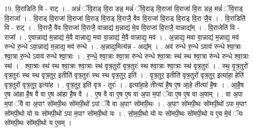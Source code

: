 \documentclass[17pt]{extarticle}
\begin{document}
19. वि॒राडिति॑ वि - राट् । . अन्नं॑ ॅवि॒राड् वि॒रा डन्न॒ मन्नं॑ ॅवि॒राड् वि॒राजा॑ वि॒राजा॑ वि॒रा डन्न॒ मन्नं॑ ॅवि॒राड् वि॒राजा᳚ । . वि॒राड् वि॒राजा॑ वि॒राजा॑ वि॒राड् वि॒राड् वि॒राजै॒ वैव वि॒राजा॑ वि॒राड् वि॒राड् वि॒रा जै॒व । . वि॒राडिति॑ वि - राट् । . वि॒राजै॒ वैव वि॒राजा॑ वि॒राजै॒ वान्नाद्य॑ म॒न्नाद्य॑ मे॒व वि॒राजा॑ वि॒राजै॒ वान्नाद्य᳚म् । . वि॒राजेति॑ वि - राजा᳚ । . ए॒वान्नाद्य॑ म॒न्नाद्य॑ मे॒वै वान्नाद्य॒ मवा वा॒न्नाद्य॑ मे॒वै वान्नाद्य॒ मव॑ । . अ॒न्नाद्य॒ मवा वा॒न्नाद्य॑ म॒न्नाद्य॒ मव॑ रुन्धे रु॒न्धे ऽवा॒न्नाद्य॑ म॒न्नाद्य॒ मव॑ रुन्धे । . अ॒न्नाद्य॒मित्य॑न्न - अद्य᳚म् । . अव॑ रुन्धे रु॒न्धे ऽवाव॑ रुन्धे श्वा॒त्राः श्वा॒त्रा रु॒न्धे ऽवाव॑ रुन्धे श्वा॒त्राः । . रु॒न्धे॒ श्वा॒त्राः श्वा॒त्रा रु॑न्धे रुन्धे श्वा॒त्राः स्थ॑ स्थ श्वा॒त्रा रु॑न्धे रुन्धे श्वा॒त्राः स्थ॑ । . श्वा॒त्राः स्थ॑ स्थ श्वा॒त्राः श्वा॒त्राः स्थ॑ वृत्र॒तुरो॑ वृत्र॒तुरः॑ स्थ श्वा॒त्राः श्वा॒त्राः स्थ॑ वृत्र॒तुरः॑ । . स्थ॒ वृ॒त्र॒तुरो॑ वृत्र॒तुरः॑ स्थ स्थ वृत्र॒तुर॒ इतीति॑ वृत्र॒तुरः॑ स्थ स्थ वृत्र॒तुर॒ इति॑ । . वृ॒त्र॒तुर॒ इतीति॑ वृत्र॒तुरो॑ वृत्र॒तुर॒ इत्या॑हा॒ हेति॑ वृत्र॒तुरो॑ वृत्र॒तुर॒ इत्या॑ह । . वृ॒त्र॒तुर॒ इति॑ वृत्र - तुरः॑ । . इत्या॑हा॒हे तीत्या॑ है॒ष ए॒ष आ॒हे तीत्या॑ है॒षः । . आ॒है॒ष ए॒ष आ॑हा है॒ष वै वा ए॒ष आ॑हा है॒ष वै । . ए॒ष वै वा ए॒ष ए॒ष वा अ॒पा म॒पां ॅवा ए॒ष ए॒ष वा अ॒पाम् । . वा अ॒पा म॒पां ॅवै वा अ॒पाꣳ सो॑मपी॒थः सो॑मपी॒थो॑ ऽपां ॅवै वा अ॒पाꣳ सो॑मपी॒थः । . अ॒पाꣳ सो॑मपी॒थः सो॑मपी॒थो॑ ऽपा म॒पाꣳ सो॑मपी॒थो यो यः सो॑मपी॒थो॑ ऽपा म॒पाꣳ सो॑मपी॒थो यः । . सो॒म॒पी॒थो यो यः सो॑मपी॒थः सो॑मपी॒थो य ए॒व मे॒वं ॅयः सो॑मपी॒थः सो॑मपी॒थो य ए॒वम् । \newline
\end{document}
